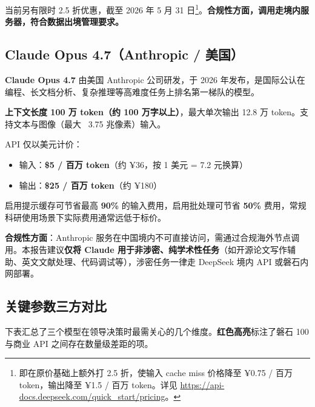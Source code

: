 当前另有限时 2.5 折优惠，截至 2026 年 5 月 31 日\footnote{即在原价基础上额外打 2.5 折，使输入 cache miss 价格降至 ¥0.75 / 百万 token，输出降至 ¥1.5 / 百万 token。详见 \url{https://api-docs.deepseek.com/quick_start/pricing}。}。\textbf{合规性方面，调用走境内服务器，符合数据出境管理要求。}

\subsection{Claude Opus 4.7（Anthropic / 美国）}

\textbf{Claude Opus 4.7} 由美国 Anthropic 公司研发，于 2026 年发布，是国际公认在编程、长文档分析、复杂推理等高难度任务上排名第一梯队的模型。

\textbf{上下文长度 100 万 token（约 100 万字以上）}，最大单次输出 12.8 万 token。支持文本与图像（最大 ~3.75 兆像素）输入。

API 仅以美元计价：

\begin{itemize}
\item 输入：\textbf{\$5 / 百万 token}（约 ¥36，按 1 美元 = 7.2 元换算）
\item 输出：\textbf{\$25 / 百万 token}（约 ¥180）
\end{itemize}

启用提示缓存可节省最高 \textbf{90\%} 的输入费用，启用批处理可节省 \textbf{50\%} 费用，常规科研使用场景下实际费用通常远低于标价。

\textbf{合规性方面}：Anthropic 服务在中国境内不可直接访问，需通过合规海外节点调用。本报告建议\textbf{仅将 Claude 用于非涉密、纯学术性任务}（如开源论文写作辅助、英文文献处理、代码调试等），涉密任务一律走 DeepSeek 境内 API 或磐石内网部署。

\subsection{关键参数三方对比}

下表汇总了三个模型在领导决策时最需关心的几个维度。\textbf{红色高亮}标注了磐石 100 与商业 API 之间存在数量级差距的项。

